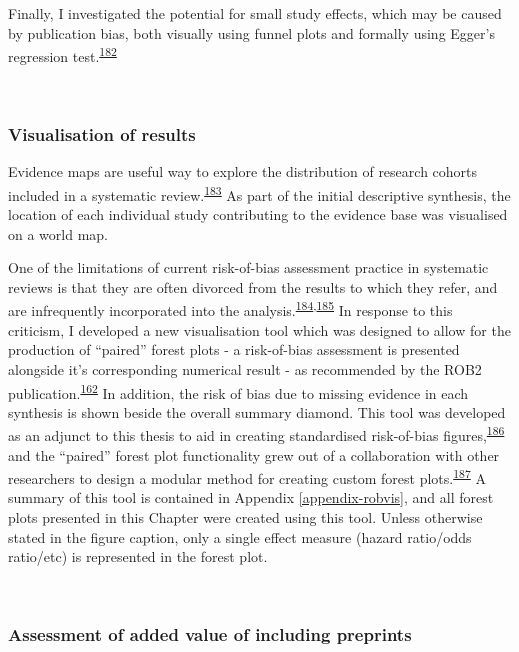 \documentclass[a4paper, twoside]{templates/ociamthesis}
\begin{document}
Finally, I investigated the potential for small study effects, which may be caused by publication bias, both visually using funnel plots and formally using Egger's regression test.\textsuperscript{\protect\hyperlink{ref-sterne2011}{182}}

~

\hypertarget{sys-rev-visualising-results}{%
\subsubsection{Visualisation of results}\label{sys-rev-visualising-results}}

Evidence maps are useful way to explore the distribution of research cohorts included in a systematic review.\textsuperscript{\protect\hyperlink{ref-saran2018}{183}} As part of the initial descriptive synthesis, the location of each individual study contributing to the evidence base was visualised on a world map.

One of the limitations of current risk-of-bias assessment practice in systematic reviews is that they are often divorced from the results to which they refer, and are infrequently incorporated into the analysis.\textsuperscript{\protect\hyperlink{ref-marusic2020}{184},\protect\hyperlink{ref-katikireddi2015}{185}} In response to this criticism, I developed a new visualisation tool which was designed to allow for the production of ``paired'' forest plots - a risk-of-bias assessment is presented alongside it's corresponding numerical result - as recommended by the ROB2 publication.\textsuperscript{\protect\hyperlink{ref-sterne2019}{162}} In addition, the risk of bias due to missing evidence in each synthesis is shown beside the overall summary diamond. This tool was developed as an adjunct to this thesis to aid in creating standardised risk-of-bias figures,\textsuperscript{\protect\hyperlink{ref-mcguinness2020robvisPaper}{186}} and the ``paired'' forest plot functionality grew out of a collaboration with other researchers to design a modular method for creating custom forest plots.\textsuperscript{\protect\hyperlink{ref-zotero-14999}{187}} A summary of this tool is contained in Appendix \ref{appendix-robvis}, and all forest plots presented in this Chapter were created using this tool. Unless otherwise stated in the figure caption, only a single effect measure (hazard ratio/odds ratio/etc) is represented in the forest plot.

~

\hypertarget{assessment-of-added-value-of-including-preprints}{%
\subsubsection{Assessment of added value of including preprints}\label{assessment-of-added-value-of-including-preprints}}
\end{document}
